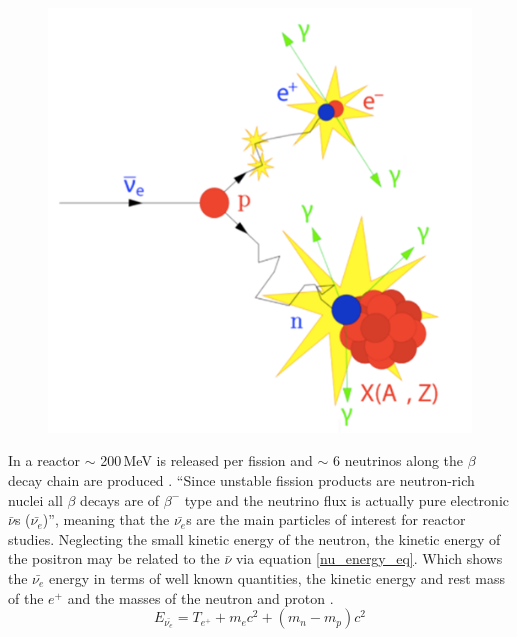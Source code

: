 \begin{figure}[!h]
  \centering
  \includegraphics[width=0.5\linewidth]{Chapter2/Figs/Raster/inverse_beta_diagram.png} 
  \label{fig:inverse_beta_diagram}
\end{figure}

In a reactor $\sim$ 200\,MeV is released per fission and $\sim$ 6 neutrinos along the $\beta$ decay chain are produced \cite{Mueller_2011}. ``Since unstable fission products are neutron-rich nuclei all $\beta$ decays are of $\beta^-$ type and the neutrino flux is actually pure electronic $\bar{\nu}$s ($\bar{\nu_e}$)''\cite{Mueller_2011}, meaning that the $\bar{\nu_e}$s are the main particles of interest for reactor studies. Neglecting the small kinetic energy of the neutron, the kinetic energy of the positron may be related to the $\bar{\nu}$ via equation \ref{nu_energy_eq}. Which shows the $\bar{\nu_e}$ energy in terms of well known quantities, the kinetic energy and rest mass of the $e^+$ and the masses of the neutron and proton \cite{Vogel_1999}. 
\begin{equation}
 E_{\bar{\nu_e}} = T_{e^+} + m_{e}c^2 + (m_n - m_p)c^2  %
\label{nu_energy_eq}
\end{equation}

